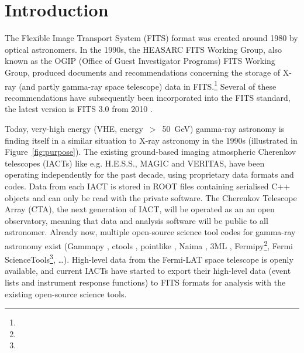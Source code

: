 \section{Introduction}

The Flexible Image Transport System (FITS) format was created around 1980 \cite{Wells:1981} by optical astronomers. In the 1990s, the HEASARC FITS Working Group, also known as the OGIP (Office of Guest Investigator Programs) FITS Working Group, produced documents and recommendations concerning the storage of X-ray (and partly gamma-ray space telescope) data in FITS.\footnote{\ogip} Several of these recommendations have subsequently been incorporated into the FITS standard, the latest version is FITS 3.0 from 2010 \cite{Pence:2010}.

% 


Today, very-high energy (VHE, energy~$>$~50~GeV) gamma-ray astronomy is finding itself in a similar situation to X-ray astronomy in the 1990s (illustrated in Figure~\ref{fig:purpose}). The existing ground-based imaging atmospheric Cherenkov telescopes (IACTs) like e.g. H.E.S.S., MAGIC and VERITAS, have been operating independently for the past decade, using proprietary data formats and codes. Data from each IACT is stored in ROOT files containing serialised C++ objects and can only be read with the private software. The Cherenkov Telescope Array (CTA), the next generation of IACT, will be operated as an an open observatory, meaning that data and analysis software will be public to all astronomer. Already now, multiple open-source science tool codes for gamma-ray astronomy exist (Gammapy \cite{2015arXiv150907408D}, ctools \cite{2016AnA...593A...1K}, pointlike \citep{2010PhDT.......147K}, Naima \citep{2015arXiv150903319Z}, 3ML \citep{2015arXiv150708343V}, Fermipy\footnote{\fermipy}, Fermi ScienceTools\footnote{\fermist}, \ldots). High-level data from the Fermi-LAT space telescope is openly available, and current IACTs have started to export their high-level data (event lists and instrument response functions) to FITS formats for analysis with the existing open-source science tools.

